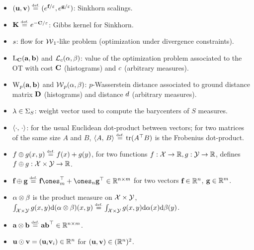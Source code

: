 \begin{itemize}
	\item $(\uD,\vD) \eqdef (e^{\fD/\varepsilon},e^{\gD/\varepsilon})$: Sinkhorn scalings.
	\item $\K \eqdef e^{-\C/\varepsilon}$: Gibbs kernel for Sinkhorn.
	\item $s$: flow for $\operatorname{\mathcal{W}}_1$-like problem (optimization under divergence constraints).
	\item $\mathrm{L}_{\mathrm{\textbf{C}}}(\mathrm{\textbf{a}},\mathrm{\textbf{b}})$ and $\mathcal{L}_c(\alpha,\beta)$: value of the optimization problem associated to the OT with cost $\mathrm{\textbf{C}}$ (histograms) and $c$ (arbitrary measures).
	\item $\operatorname{\mathrm{W}}_p(\mathrm{\textbf{a}},\mathrm{\textbf{b}})$ and $\operatorname{\mathcal{W}}_p(\alpha,\beta)$: $p$-Wasserstein distance associated to ground distance matrix $\mathrm{\textbf{D}}$ (histograms) and distance $d$ (arbitrary measures).
	\item $\lambda\in\Sigma_S$: weight vector used to compute the barycenters of $S$ measures.
	\item $\langle \cdot,\,\cdot\rangle$: for the usual Euclidean dot-product between vectors; for two matrices of the same size $A$ and $B$, $\dotp{A}{B} \eqdef \trace(A^\top B)$ is the Frobenius dot-product.
	\item $\f\oplus \g(x,y) \eqdef f(x)+g(y)$, for two functions $f : \mathcal{X} \rightarrow \mathbb{R}, g : \mathcal{Y} \rightarrow \mathbb{R}$, defines
		$f \oplus g : \mathcal{X}\times \mathcal{Y} \rightarrow \mathbb{R}$.
	\item $\fD \oplus \gD \eqdef \fD \ones_m^\top + \ones_n \gD^\top \in \RR^{n\times m}$ for two vectors $\mathrm{\textbf{f}}\in\mathbb{R}^n$, $\mathrm{\textbf{g}}\in\mathbb{R}^m$.
	\item $\alpha \otimes \beta$ is the product measure on $\mathcal{X} \times \mathcal{Y}$, \ie 
		$\int_{\X \times \Y} g(x,y) \d(\al\otimes\be)(x,y) \eqdef \int_{\X \times \Y} g(x,y) \d\al(x) \d\be(y)$.
	\item $\a \otimes \b \eqdef \a \b^\top \in \RR^{n \times m}$. 
	\item $\mathrm{\textbf{u}} \odot \mathrm{\textbf{v}} = (\mathrm{\textbf{u}}_i \mathrm{\textbf{v}}_i) \in \mathbb{R}^n$ for $(\mathrm{\textbf{u}}, \mathrm{\textbf{v}}) \in (\mathbb{R}^n)^2$.
\end{itemize}